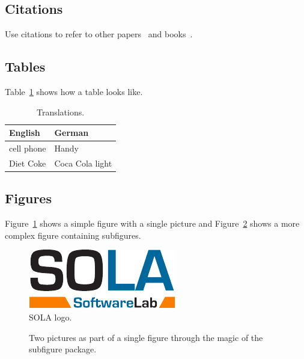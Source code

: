 \documentclass[authoryear,preprint]{sigplanconf}
\begin{document}
\subsection{Citations}

Use citations to refer to other 
papers~\cite{HerlihyMoss1993-TransactionalMemory,FraserHanson1992-CodeGenerator} 
and books~\cite{Strunk-ElementsOfStyle,Aho86-Compilers}.


\subsection{Tables}

Table~\ref{t:Translations} shows how a table looks like.

\begin{table}[ht]
\centering
\begin{tabular}{ll}
\hline
\textbf{English} & \textbf{German}\\
\hline
cell phone       & Handy\\
Diet Coke        & Coca Cola light\\
\hline
\end{tabular}
\caption[Translations]{\label{t:Translations}Translations.}
\end{table}

\subsection{Figures}

Figure~\ref{f:SOLAlogo} shows a simple figure with a single picture
and Figure~\ref{f:SubfigureExample} shows a more complex figure
containing subfigures.

\begin{figure}[ht]
\centering
\includegraphics[width=.6\linewidth]{figures/SOLALogo}
\caption[SOLA logo]{\label{f:SOLAlogo}SOLA logo.}
\end{figure}

\begin{figure}[ht]
\centering
{}\quad
{}
\caption[Subfigure example]{\label{f:SubfigureExample}Two pictures as
  part of a single figure through the magic of the subfigure package.}
\end{figure}
\end{document}
